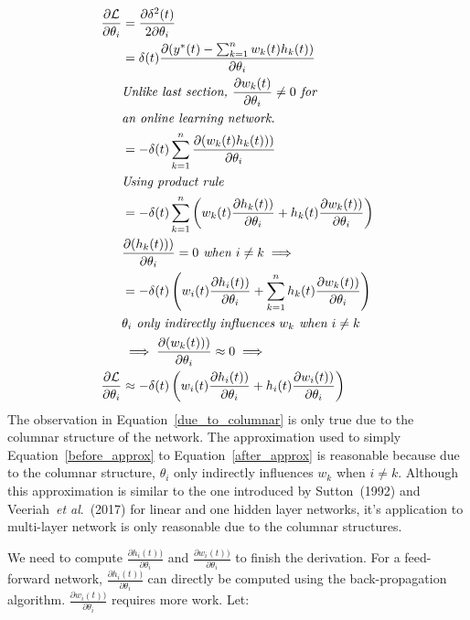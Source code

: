 \documentclass{article}
\newcommand{\etal}{\textit{et al}.}
\begin{document}
\begin{align}
          \frac{\partial \mathcal L}{ \partial \theta_i} &= \frac{\partial \delta^2(t)}{ 2\partial \theta_i } \notag \\
          &= \delta(t)\frac{\partial(y^*(t) - \sum_{k=1}^{n} w_k(t) h_k(t))}{ \partial \theta_i}  \notag \\
          & \textit{Unlike last section, $\frac{\partial w_k(t)}{\partial \theta_i}\ne0$ for} \notag\\
          & \textit{an online learning network.} \notag \\
          &= - \delta(t)\sum_{k=1}^{n}  \frac{\partial (w_k(t) h_k(t)))}{ \partial \theta_i} \notag \\
          & \textit{Using product rule} \notag \\ 
           &= - \delta(t)\sum_{k=1}^{n} \left (  w_k(t)\frac{\partial  h_k(t))}{ \partial \theta_i} + h_k(t)\frac{\partial  w_k(t))}{ \partial \theta_i}\right) \notag  \\
             & \frac{\partial ( h_k(t)))}{ \partial \theta_i}=0 \textit{ when }i \ne k \implies \label{due_to_columnar}\\
           &= - \delta(t)\left (  w_i(t)\frac{\partial  h_i(t))}{ \partial \theta_i} + \sum_{k=1}^{n}  h_k(t)\frac{\partial  w_k(t))}{ \partial \theta_i} \right) \label{before_approx} \\
           & \theta_i \textit{ only indirectly influences } w_k \textit{ when }i \ne k \notag \\ & \implies \frac{\partial ( w_k(t)))}{ \partial \theta_i}\approx 0  \implies  \notag \\
           \frac{\partial \mathcal L}{ \partial \theta_i} &\approx - \delta(t)\left (  w_i(t)\frac{\partial  h_i(t))}{ \partial \theta_i} +  h_i(t)\frac{\partial  w_i(t))}{ \partial \theta_i} \right) \label{after_approx}
    \end{align}
The observation in Equation~\ref{due_to_columnar} is only true due to the columnar structure of the network. The approximation used to simply Equation~\ref{before_approx} to Equation~\ref{after_approx} is reasonable because due to the columnar structure, $\theta_i$ only indirectly influences $w_k$ when $i\ne k$.  Although this approximation is similar to the one introduced by Sutton~(1992) and Veeriah~\etal~(2017) for linear and one hidden layer networks, it's application to multi-layer network is only reasonable due to the columnar structures. 

We need to compute $\frac{\partial  h_i(t))}{ \partial \theta_i}$ and $\frac{\partial  w_i(t))}{ \partial \theta_i}$ to finish the derivation. For a feed-forward network, $\frac{\partial  h_i(t))}{ \partial \theta_i}$ can directly be computed using the back-propagation algorithm. $\frac{\partial  w_i(t))}{ \partial \theta_i}$ requires more work. Let: 
\end{document}
